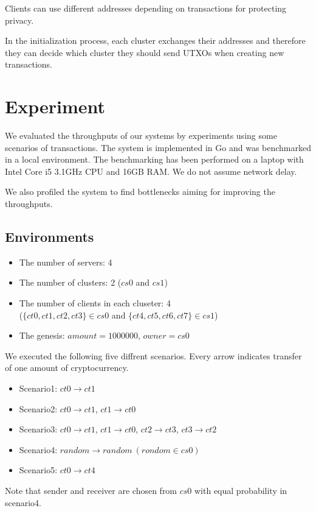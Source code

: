 \documentclass[a4paper, oneside]{discothesis}
\begin{document}
Clients can use different addresses depending on transactions for protecting privacy.

In the initialization process, each cluster exchanges their addresses and therefore they can decide which cluster they should send UTXOs when creating new transactions.


\chapter{Experiment}
We evaluated the throughputs of our systems by experiments using some scenarios of transactions.
The system is implemented in Go and was benchmarked in a local environment.
The benchmarking has been performed on a laptop with Intel Core i5 3.1GHz CPU and 16GB RAM.
We do not assume network delay.

We also profiled the system to find bottlenecks aiming for improving the throughputs.

\section{Environments}
\begin{itemize}
    \item The number of servers: 4
    \item The number of clusters: 2 ($cs0$ and $cs1$)
    \item The number of clients in each cluseter: 4\\
        ($\{ct0, ct1, ct2, ct3\} \in cs0$ and $\{ct4, ct5, ct6, ct7\} \in cs1$)
    \item The genesis: $amount = 1000000$, $owner = cs0$
\end{itemize}

We executed the following five diffrent scenarios.
Every arrow indicates transfer of one amount of cryptocurrency.
\begin{itemize}
    \item Scenario1: $ct0 \rightarrow ct1$
    \item Scenario2: $ct0 \rightarrow ct1$, $ct1 \rightarrow ct0$
    \item Scenario3: $ct0 \rightarrow ct1$, $ct1 \rightarrow ct0$, $ct2 \rightarrow ct3$, $ct3 \rightarrow ct2$
    \item Scenario4: $random \rightarrow random~(rondom \in cs0)$
    \item Scenario5: $ct0 \rightarrow ct4$
\end{itemize}
Note that sender and receiver are chosen from $cs0$ with equal probability in scenario4.
\end{document}
